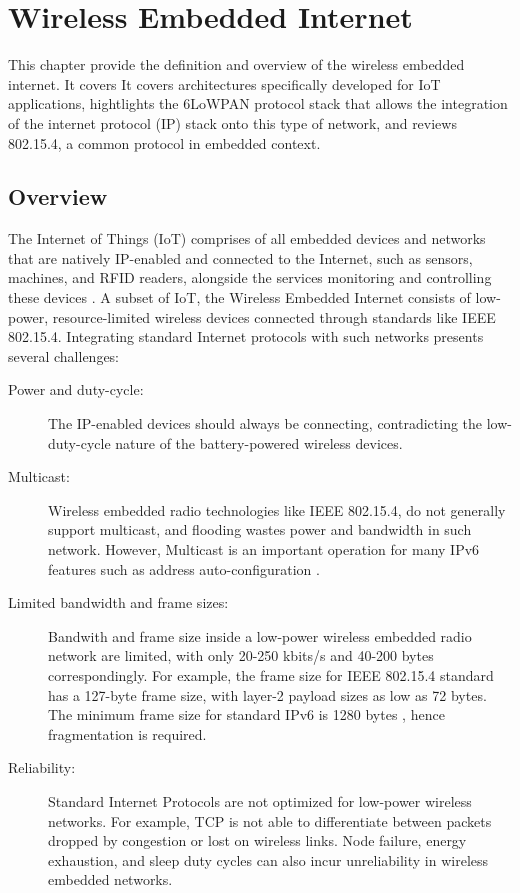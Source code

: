 \chapter{Wireless Embedded Internet}

This chapter provide the definition and overview of the wireless embedded internet. It covers
It covers architectures specifically developed for IoT applications, hightlights the 6LoWPAN
protocol stack that allows the integration of the internet protocol (IP) stack onto this type
of network, and reviews 802.15.4, a common protocol in embedded context.

\section{Overview}
The Internet of Things (IoT) comprises of all embedded devices and networks that are natively 
IP-enabled and connected to the Internet, such as sensors, machines, and RFID readers, 
alongside the services monitoring and controlling these devices \cite{wie}. A subset of IoT, 
the Wireless Embedded Internet consists of low-power, resource-limited wireless devices 
connected through standards like IEEE 802.15.4. Integrating standard Internet protocols with such networks 
presents several challenges:

\begin{description}
  \item[Power and duty-cycle:] The IP-enabled devices should always be connecting, contradicting the low-duty-cycle
 nature of the battery-powered wireless devices.
  \item[Multicast:] Wireless embedded radio technologies like IEEE 802.15.4, do not generally support multicast, and
 flooding wastes power and bandwidth in such network. However, Multicast is an important operation
 for many IPv6 features such as address auto-configuration \cite{rfc4862}. 
  \item[Limited bandwidth and frame sizes:] Bandwith and frame size inside a low-power wireless embedded radio network
 are limited, with only 20-250 kbits/s and 40-200 bytes correspondingly. For example, the frame size 
 for IEEE 802.15.4 standard has a 127-byte frame size, with layer-2 payload sizes as low as 72 bytes. The minimum
 frame size for standard IPv6 is 1280 bytes \cite{rfc8200}, hence fragmentation is required.
  \item[Reliability:] Standard Internet Protocols are not optimized for low-power wireless networks. For
 example, TCP is not able to differentiate between packets dropped by congestion or lost on wireless links.
 Node failure, energy exhaustion, and sleep duty cycles can also incur unreliability in wireless embedded networks.
\end{description}

